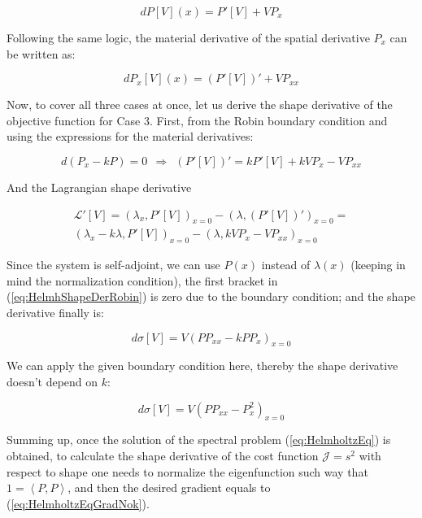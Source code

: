 \begin{equation}
dP[V](x) = P'[V] + V P_x 
\end{equation}

Following the same logic, the material derivative of the spatial derivative $P_x$ can be written as:

\begin{equation}
dP_x[V](x) = \left(P'[V]\right)' + V P_{xx} 
\end{equation}

Now, to cover all three cases at once, let us derive the shape derivative of the objective function for Case 3. First, from the Robin boundary condition and using the expressions for the material derivatives:

\begin{equation}
d(P_x - k P) = 0 \ \ \Rightarrow \ \ \left(P'[V]\right)' = k P'[V] + k V P_x -  V P_{xx}
\end{equation}

And the Lagrangian shape derivative

\begin{subequations}
\begin{align}
\mathcal{L}'[V] = \left( \lambda_x , P'[V] \right)_{x = 0} - \left( \lambda , \left(P'[V]\right)'  \right)_{x = 0} = \\
\label{eq:HelmhShapeDerRobin}
\left( \lambda_x - k \lambda, P'[V] \right)_{x = 0}- \left( \lambda , k V P_x - VP_{xx}  \right)_{x = 0}
\end{align}
\end{subequations}

Since the system is self-adjoint, we can use $P(x)$ instead of $\lambda(x)$ (keeping in mind the normalization condition), the first bracket in (\ref{eq:HelmhShapeDerRobin}) is zero due to the boundary condition; and the shape derivative finally is:

\begin{equation}
\label{eq:HelmholtzEqGrad}
    d \sigma [V] = V \left( P P_{xx} - k P P_x \right)_{x = 0}
\end{equation}

We can apply the given boundary condition here, thereby the shape derivative doesn't depend on $k$:

\begin{equation}
\label{eq:HelmholtzEqGradNok}
    d \sigma [V] = V \left( P P_{xx} - P_x^2 \right)_{x = 0}
\end{equation}

Summing up, once the solution of the spectral problem (\ref{eq:HelmholtzEq}) is obtained, to calculate the shape derivative of the cost function $\mathcal{J} = s^2$ with respect to shape one needs to normalize the eigenfunction such way that $1 = \left<P,P\right>$, and then the desired gradient equals to (\ref{eq:HelmholtzEqGradNok}).

